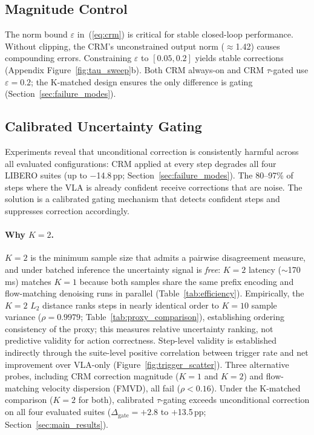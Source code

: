 \subsection{Magnitude Control}
\label{sec:magnitude}

The norm bound $\varepsilon$ in~(\ref{eq:crm}) is critical for stable closed-loop performance. Without clipping, the CRM's unconstrained output norm (${\approx}$1.42) causes compounding errors. Constraining $\varepsilon$ to $[0.05, 0.2]$ yields stable corrections (Appendix Figure~\ref{fig:tau_sweep}b). Both CRM always-on and CRM $\tau$-gated use $\varepsilon{=}0.2$; the K-matched design ensures the only difference is gating (Section~\ref{sec:failure_modes}).

\subsection{Calibrated Uncertainty Gating}
\label{sec:adaptive_k_method}

Experiments reveal that unconditional correction is consistently harmful across all evaluated configurations: CRM applied at every step degrades all four LIBERO suites (up to $-$14.8\,pp; Section~\ref{sec:failure_modes}). The 80--97\% of steps where the VLA is already confident receive corrections that are noise. The solution is a calibrated gating mechanism that detects confident steps and suppresses correction accordingly.

\paragraph{Why $K{=}2$.}
$K{=}2$ is the minimum sample size that admits a pairwise disagreement measure, and under batched inference the uncertainty signal is \emph{free}: $K{=}2$ latency (${\sim}$170\,ms) matches $K{=}1$ because both samples share the same prefix encoding and flow-matching denoising runs in parallel (Table~\ref{tab:efficiency}). Empirically, the $K{=}2$ $L_2$ distance ranks steps in nearly identical order to $K{=}10$ sample variance ($\rho{=}0.9979$; Table~\ref{tab:proxy_comparison}), establishing ordering consistency of the proxy; this measures relative uncertainty ranking, not predictive validity for action correctness. Step-level validity is established indirectly through the suite-level positive correlation between trigger rate and net improvement over VLA-only (Figure~\ref{fig:trigger_scatter}). Three alternative probes, including CRM correction magnitude ($K{=}1$ and $K{=}2$) and flow-matching velocity dispersion (FMVD), all fail ($\rho < 0.16$). Under the K-matched comparison ($K{=}2$ for both), calibrated $\tau$-gating exceeds unconditional correction on all four evaluated suites ($\Delta_{\mathrm{gate}}{=}{+}2.8$ to $+$13.5\,pp; Section~\ref{sec:main_results}).

